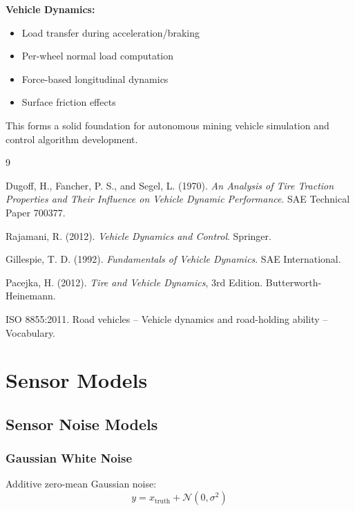 \documentclass[11pt,a4paper]{article}
\begin{document}
\textbf{Vehicle Dynamics:}
\begin{itemize}
    \item Load transfer during acceleration/braking
    \item Per-wheel normal load computation
    \item Force-based longitudinal dynamics
    \item Surface friction effects
\end{itemize}

This forms a solid foundation for autonomous mining vehicle simulation and control algorithm development.

\begin{thebibliography}{9}

Dugoff, H., Fancher, P. S., and Segel, L. (1970).
\textit{An Analysis of Tire Traction Properties and Their Influence on Vehicle Dynamic Performance}.
SAE Technical Paper 700377.

Rajamani, R. (2012). \textit{Vehicle Dynamics and Control}. Springer.

Gillespie, T. D. (1992). \textit{Fundamentals of Vehicle Dynamics}. SAE International.

Pacejka, H. (2012). \textit{Tire and Vehicle Dynamics}, 3rd Edition. Butterworth-Heinemann.

ISO 8855:2011. Road vehicles -- Vehicle dynamics and road-holding ability -- Vocabulary.

\end{thebibliography}

\appendix



\section{Sensor Models}

\subsection{Sensor Noise Models}

\subsubsection{Gaussian White Noise}

Additive zero-mean Gaussian noise:
\begin{equation}
y = x_{\text{truth}} + \mathcal{N}(0, \sigma^2)
\end{equation}
\end{document}
